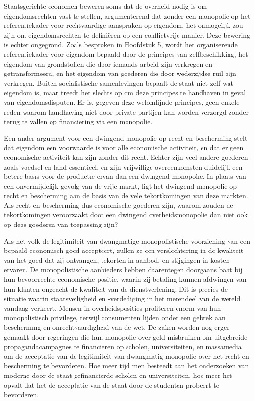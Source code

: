 Staatsgerichte economen beweren soms dat de overheid nodig is om eigendomsrechten vast te stellen, argumenterend dat zonder een monopolie op het referentiekader voor rechtvaardige aanspraken op eigendom, het onmogelijk zou zijn om eigendomsrechten te definiëren op een conflictvrije manier. Deze bewering is echter ongegrond. Zoals besproken in Hoofdstuk 5, wordt het organiserende referentiekader voor eigendom bepaald door de principes van zelfbeschikking, het eigendom van grondstoffen die door iemands arbeid zijn verkregen en getransformeerd, en het eigendom van goederen die door wederzijdse ruil zijn verkregen. Buiten socialistische samenlevingen bepaalt de staat niet zelf wat eigendom is, maar treedt het slechts op om deze principes te handhaven in geval van eigendomsdisputen. Er is, gegeven deze welomlijnde principes, geen enkele reden waarom handhaving niet door private partijen kan worden verzorgd zonder terug te vallen op financiering via een monopolie.

Een ander argument voor een dwingend monopolie op recht en bescherming stelt dat eigendom een voorwaarde is voor alle economische activiteit, en dat er geen economische activiteit kan zijn zonder dit recht. Echter zijn veel andere goederen zoals voedsel en land essentieel, en zijn vrijwillige overeenkomsten duidelijk een betere basis voor de productie ervan dan een dwingend monopolie. In plaats van een onvermijdelijk gevolg van de vrije markt, ligt het dwingend monopolie op recht en bescherming aan de basis van de vele tekortkomingen van deze markten. Als recht en bescherming dus economische goederen zijn, waarom zouden de tekortkomingen veroorzaakt door een dwingend overheidsmonopolie dan niet ook op deze goederen van toepassing zijn?

Als het volk de legitimiteit van dwangmatige monopolistische voorziening van een bepaald economisch goed accepteert, zullen ze een verslechtering in de kwaliteit van het goed dat zij ontvangen, tekorten in aanbod, en stijgingen in kosten ervaren. De monopolistische aanbieders hebben daarentegen doorgaans baat bij hun bevoorrechte economische positie, waarin zij betaling kunnen afdwingen van hun klanten ongeacht de kwaliteit van de dienstverlening. Dit is precies de situatie waarin staatsveiligheid en -verdediging in het merendeel van de wereld vandaag verkeert. Mensen in overheidsposities profiteren enorm van hun monopolistisch privilege, terwijl consumenten lijden onder een gebrek aan bescherming en onrechtvaardigheid van de wet. De zaken worden nog erger gemaakt door regeringen die hun monopolie over geld misbruiken om uitgebreide propagandacampagnes te financieren op scholen, universiteiten, en massamedia om de acceptatie van de legitimiteit van dwangmatig monopolie over het recht en bescherming te bevorderen. Hoe meer tijd men besteedt aan het onderzoeken van moderne door de staat gefinancierde scholen en universiteiten, hoe meer het opvalt dat het de acceptatie van de staat door de studenten probeert te bevorderen.

